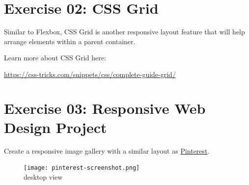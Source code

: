 \documentclass{42-en}
\begin{document}

\chapter{Exercise 02: CSS Grid}

\exnumber{\exercicenumber}

\makeheaderfiles

Similar to Flexbox, CSS Grid is another responsive layout feature that will help arrange elements within a parent container.\par
\vspace{.2in}
Learn more about CSS Grid here: \par
\url{https://css-tricks.com/snippets/css/complete-guide-grid/}


\chapter{Exercise 03: Responsive Web Design Project}

\exnumber{\exercicenumber}

\makeheaderfiles

Create a responsive image gallery with a similar layout as \href{https://www.pinterest.com/}{Pinterest}. \par

\begin{figure}[H]
    \begin{center}
        \texttt{[image: pinterest-screenshot.png]}\\
        desktop view
    \end{center}
\end{figure}
\end{document}
